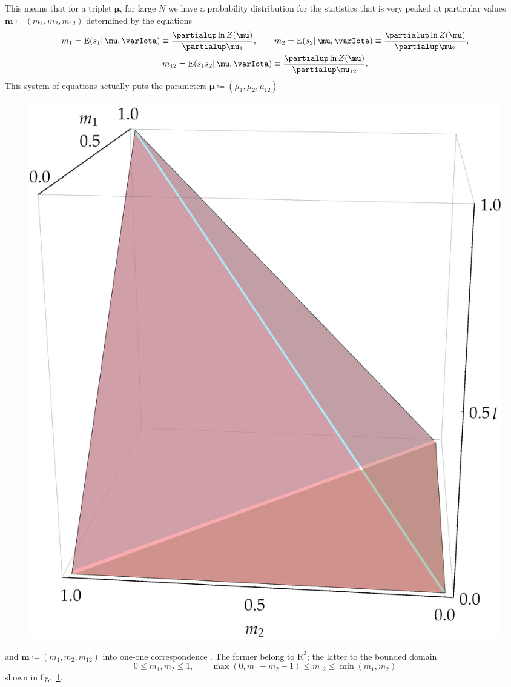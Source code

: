 \documentclass[\ifafour a4paper,12pt,\else a5paper,10pt,\fi%
onecolumn,oneside,article,%
british%
]{memoir}
\theoremstyle{remark}
\theoremstyle{innote}
\newcommand*{\citep}{\parencites}
\newcommand*{\de}{\partialup}%
\newcommand*{\RR}{\bm{\mathrm{R}}}
\newcommand*{\defd}{\coloneqq}
\renewcommand{\le}{\leqslant}%
\renewcommand*{\|}{\mathpunct{|}}
\newcommand*{\fig}{fig.}%
\newcommand*{\E}{\mathrm{E}}
\DeclarePairedDelimiter\expp{(}{)}
\newcommand*{\expe}{\E\expp}%
\newcommand*{\yI}{\varIota}
\newcommand*{\la}{\mu_{12}}
\newcommand*{\yth}{\bm{\mu}}
\newcommand*{\yt}{\bm{m}}
\newcommand*{\yl}{m_{12}}
\begin{document}
This means that for a triplet $\yth$, for large $N$ we have a probability
distribution for the statistics that is very peaked at particular values
$\yt \defd (m_1,m_2,\yl)$ determined by the equations
\begin{equation}
  \label{eq:change_coords}
  \begin{gathered}
    m_1 = \expe{s_1 \|\yth,\yI}
    \equiv \frac{\de\ln Z(\yth)}{\de \mu_1},
    \qquad
  m_2 = \expe{s_2 \|\yth,\yI}
    \equiv \frac{\de\ln Z(\yth)}{\de \mu_2},\\
  \yl = \expe{s_1 s_2\|\yth,\yI}
    \equiv \frac{\de\ln Z(\yth)}{\de\la}.
  \end{gathered}
\end{equation}
This system of equations actually puts the parameters
$\yth \defd(\mu_1, \mu_2, \la)$
\begin{figure}[t!]%
  \centering\includegraphics[width=0.75\linewidth]{domain.png}\\
  \caption{}
  \label{fig:domain}
\end{figure}%
and $\yt\defd(m_1, m_2,\yl)$ into one-one
correspondence \citep{meadetal1984}. The former belong to $\RR^3$; the
latter to the bounded domain
\begin{equation}
  \label{eq:domain_newcoords}
  0\le m_1,m_2 \le 1,
  \qquad
  \max(0,m_1 + m_2 -1) \le \yl \le \min(m_1,m_2)
\end{equation}
shown in \fig~\ref{fig:domain}.
\end{document}
